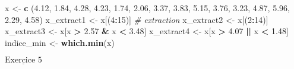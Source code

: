 \documentclass[]{article}
\newenvironment{Shaded}{\begin{snugshade}}{\end{snugshade}}
\newcommand{\CommentTok}[1]{\textcolor[rgb]{0.56,0.35,0.01}{\textit{#1}}}
\newcommand{\DecValTok}[1]{\textcolor[rgb]{0.00,0.00,0.81}{#1}}
\newcommand{\FloatTok}[1]{\textcolor[rgb]{0.00,0.00,0.81}{#1}}
\newcommand{\KeywordTok}[1]{\textcolor[rgb]{0.13,0.29,0.53}{\textbf{#1}}}
\newcommand{\NormalTok}[1]{#1}
\newcommand{\OperatorTok}[1]{\textcolor[rgb]{0.81,0.36,0.00}{\textbf{#1}}}
\newcommand{\StringTok}[1]{\textcolor[rgb]{0.31,0.60,0.02}{#1}}
\begin{document}
\begin{Shaded}
\begin{Highlighting}[]
\NormalTok{x <-}\StringTok{ }\KeywordTok{c}\NormalTok{ (}\FloatTok{4.12}\NormalTok{, }\FloatTok{1.84}\NormalTok{, }\FloatTok{4.28}\NormalTok{, }\FloatTok{4.23}\NormalTok{, }\FloatTok{1.74}\NormalTok{, }\FloatTok{2.06}\NormalTok{, }\FloatTok{3.37}\NormalTok{, }\FloatTok{3.83}\NormalTok{, }\FloatTok{5.15}\NormalTok{, }\FloatTok{3.76}\NormalTok{, }\FloatTok{3.23}\NormalTok{, }\FloatTok{4.87}\NormalTok{,}
\FloatTok{5.96}\NormalTok{, }\FloatTok{2.29}\NormalTok{, }\FloatTok{4.58}\NormalTok{)}
\NormalTok{x_extract1 <-}\StringTok{ }\NormalTok{x[(}\DecValTok{4}\OperatorTok{:}\DecValTok{15}\NormalTok{)] }\CommentTok{# extraction}
\NormalTok{x_extract2 <-}\StringTok{ }\NormalTok{x[(}\DecValTok{2}\OperatorTok{:}\DecValTok{14}\NormalTok{)]}
\NormalTok{x_extract3 <-}\StringTok{ }\NormalTok{x[x }\OperatorTok{>}\StringTok{ }\FloatTok{2.57} \OperatorTok{&}\StringTok{ }\NormalTok{x }\OperatorTok{<}\StringTok{ }\FloatTok{3.48}\NormalTok{]}
\NormalTok{x_extract4 <-}\StringTok{ }\NormalTok{x[x }\OperatorTok{>}\StringTok{ }\FloatTok{4.07}  \OperatorTok{||}\StringTok{ }\NormalTok{x }\OperatorTok{<}\StringTok{ }\FloatTok{1.48}\NormalTok{]}
\NormalTok{indice_min <-}\StringTok{ }\KeywordTok{which.min}\NormalTok{(x)}
\end{Highlighting}
\end{Shaded}

\(\underline{\text{Exercice 5}}\)
\end{document}
